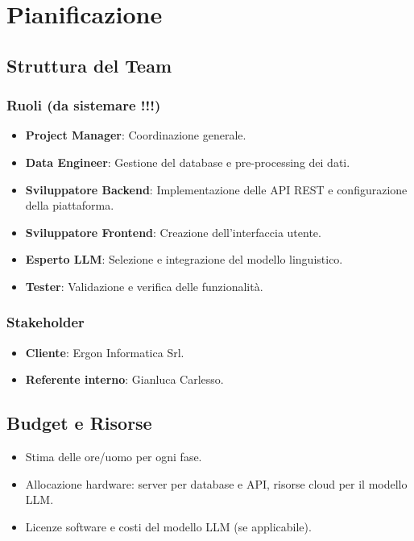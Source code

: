 \documentclass{article}
\begin{document}



\section{Pianificazione}
    \subsection{Struttura del Team}
        \subsubsection{Ruoli (da sistemare !!!)}
        \begin{itemize}
            \item \textbf{Project Manager}: Coordinazione generale.
            \item \textbf{Data Engineer}: Gestione del database e pre-processing dei dati.
            \item \textbf{Sviluppatore Backend}: Implementazione delle API REST e configurazione della piattaforma.
            \item \textbf{Sviluppatore Frontend}: Creazione dell’interfaccia utente.
            \item \textbf{Esperto LLM}: Selezione e integrazione del modello linguistico.
            \item \textbf{Tester}: Validazione e verifica delle funzionalità.
        \end{itemize}
        \subsubsection{Stakeholder}
        \begin{itemize}
            \item \textbf{Cliente}: Ergon Informatica Srl.
            \item \textbf{Referente interno}: Gianluca Carlesso.
        \end{itemize}

    \subsection{Budget e Risorse}
    \begin{itemize}
        \item Stima delle ore/uomo per ogni fase.
        \item Allocazione hardware: server per database e API, risorse cloud per il modello LLM.
        \item Licenze software e costi del modello LLM (se applicabile).
    \end{itemize}
\end{document}
